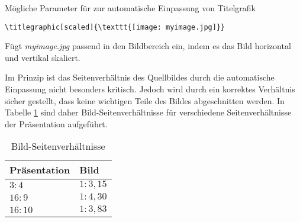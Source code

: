 \begin{desctable}
\toprule
{}
\bottomrule
\caption{Mögliche Parameter für  zur
automatische Einpassung von Titelgrafik}
\end{desctable}

\begin{Example}
  \begin{lstlisting}
\titlegraphic[scaled]{\texttt{[image: myimage.jpg]}}
  \end{lstlisting}
  Fügt \textit{myimage.jpg} passend in den Bildbereich ein, indem es das Bild
  horizontal und vertikal skaliert.
\end{Example}

Im Prinzip ist das Seitenverhältnis des Quellbildes durch die automatische
Einpassung nicht besonders kritisch. Jedoch wird durch ein korrektes Verhältnis
sicher gestellt, dass keine wichtigen Teile des Bildes abgeschnitten werden.
In Tabelle \ref{tab:picratio} sind daher Bild-Seiten\-verhältnisse für
verschiedene Seitenverhältnisse der Präsentation aufgeführt.

\begin{table}[ht]
\centering
\begin{tabular}{ll}
\toprule
\bfseries Präsentation  & \bfseries  Bild  \\
\midrule
$3:4$   & $1:3{,}15$ \\
$16:9$  & $1:4{,}30$ \\
$16:10$ & $1:3{,}83$ \\
\bottomrule
\end{tabular}
\caption{Bild-Seitenverhältnisse}
\label{tab:picratio}
\end{table}



